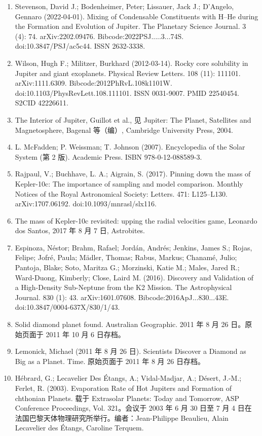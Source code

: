 \begin{enumerate}
\item Stevenson, David J.; Bodenheimer, Peter; Lissauer, Jack J.; D'Angelo, Gennaro (2022-04-01). Mixing of Condensable Constituents with H–He during the Formation and Evolution of Jupiter. The Planetary Science Journal. 3 (4): 74. arXiv:2202.09476. Bibcode:2022PSJ.....3...74S. doi:10.3847/PSJ/ac5c44. ISSN 2632-3338.
\item Wilson, Hugh F.; Militzer, Burkhard (2012-03-14). Rocky core solubility in Jupiter and giant exoplanets. Physical Review Letters. 108 (11): 111101. arXiv:1111.6309. Bibcode:2012PhRvL.108k1101W. doi:10.1103/PhysRevLett.108.111101. ISSN 0031-9007. PMID 22540454. S2CID 42226611.
\item The Interior of Jupiter, Guillot et al., 见 Jupiter: The Planet, Satellites and Magnetosphere, Bagenal 等（编）, Cambridge University Press, 2004.
\item L. McFadden; P. Weissman; T. Johnson (2007). Encyclopedia of the Solar System (第 2 版). Academic Press. ISBN 978-0-12-088589-3.
\item Rajpaul, V.; Buchhave, L. A.; Aigrain, S. (2017). Pinning down the mass of Kepler{-}10c: The importance of sampling and model comparison. Monthly Notices of the Royal Astronomical Society: Letters. 471: L125–L130. arXiv:1707.06192. doi:10.1093/mnrasl/slx116.
\item The mass of Kepler{-}10c revisited: upping the radial velocities game, Leonardo dos Santos, 2017 年 8 月 7 日, Astrobites.
\item Espinoza, Néstor; Brahm, Rafael; Jordán, Andrés; Jenkins, James S.; Rojas, Felipe; Jofré, Paula; Mädler, Thomas; Rabus, Markus; Chanamé, Julio; Pantoja, Blake; Soto, Maritza G.; Morzinski, Katie M.; Males, Jared R.; Ward-Duong, Kimberly; Close, Laird M. (2016). Discovery and Validation of a High-Density Sub-Neptune from the K2 Mission. The Astrophysical Journal. 830 (1): 43. arXiv:1601.07608. Bibcode:2016ApJ...830...43E. doi:10.3847/0004-637X/830/1/43.
\item Solid diamond planet found. Australian Geographic. 2011 年 8 月 26 日。原始页面于 2011 年 10 月 6 日存档。
\item Lemonick, Michael (2011 年 8 月 26 日). Scientists Discover a Diamond as Big as a Planet. Time. 原始页面于 2011 年 8 月 26 日存档。
\item Hébrard, G.; Lecavelier Des Étangs, A.; Vidal-Madjar, A.; Désert, J.-M.; Ferlet, R. (2003). Evaporation Rate of Hot Jupiters and Formation of chthonian Planets. 载于 Extrasolar Planets: Today and Tomorrow, ASP Conference Proceedings, Vol. 321。会议于 2003 年 6 月 30 日至 7 月 4 日在法国巴黎天体物理研究所举行。编者：Jean-Philippe Beaulieu, Alain Lecavelier des Étangs, Caroline Terquem.

\end{enumerate}
